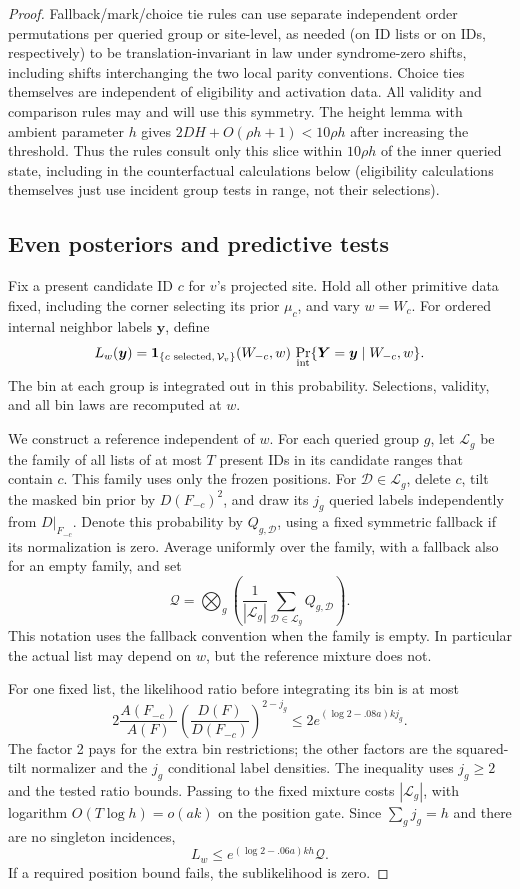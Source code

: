 \begin{proof}
Fallback/mark/choice tie rules can use separate independent order permutations per queried group or site-level, as needed (on ID lists or on IDs, respectively) to be translation-invariant in law under syndrome-zero shifts, including shifts interchanging the two local parity conventions. Choice ties themselves are independent of eligibility and activation data. All validity and comparison rules may and will use this symmetry. The height lemma with ambient parameter \(h\) gives \(2DH+O(\rho h+1)<10\rho h\) after increasing the threshold. Thus the rules consult only this slice within \(10\rho h\) of the inner queried state, including in the counterfactual calculations below (eligibility calculations themselves just use incident group tests in range, not their selections).

\subsection{Even posteriors and predictive tests}
\label{sec:internal-even-posteriors}

Fix a present candidate ID \(c\) for \(v\)'s projected site. Hold all other primitive data fixed, including the corner selecting its prior \(\mu_c\), and vary \(w=W_c\). For ordered internal neighbor labels \(\boldsymbol y\), define
\[
 L_w(\boldsymbol y)=
 \mathbf1_{\{c\text{ selected},\,\mathcal V_v\}}(W_{-c},w)\,
 \Pr_{\rm int}\{\boldsymbol Y=\boldsymbol y\mid W_{-c},w\}.
\]
The bin at each group is integrated out in this probability. Selections, validity, and all bin laws are recomputed at \(w\).

We construct a reference independent of \(w\). For each queried group \(g\), let \(\mathcal L_g\) be the family of all lists of at most \(T\) present IDs in its candidate ranges that contain \(c\). This family uses only the frozen positions. For \(\mathcal D\in\mathcal L_g\), delete \(c\), tilt the masked bin prior by \(D(F_{-c})^2\), and draw its \(j_g\) queried labels independently from \(D|_{F_{-c}}\). Denote this probability by \(Q_{g,\mathcal D}\), using a fixed symmetric fallback if its normalization is zero. Average uniformly over the family, with a fallback also for an empty family, and set
\[
 \mathcal Q=\bigotimes_g
  \left(\frac1{|\mathcal L_g|}\sum_{\mathcal D\in\mathcal L_g}Q_{g,\mathcal D}\right).
\]
This notation uses the fallback convention when the family is empty. In particular the actual list may depend on \(w\), but the reference mixture does not.

For one fixed list, the likelihood ratio before integrating its bin is at most
\[
 2\frac{A(F_{-c})}{A(F)}
       \left(\frac{D(F)}{D(F_{-c})}\right)^{2-j_g}
 \le2e^{(\log2-.08a)kj_g}.
\]
The factor 2 pays for the extra bin restrictions; the other factors are the squared-tilt normalizer and the \(j_g\) conditional label densities. The inequality uses \(j_g\ge2\) and the tested ratio bounds. Passing to the fixed mixture costs \(|\mathcal L_g|\), with logarithm \(O(T\log h)=o(ak)\) on the position gate. Since \(\sum_g j_g=h\) and there are no singleton incidences,
\[
 L_w\le e^{(\log2-.06a)kh}\mathcal Q.
\]
If a required position bound fails, the sublikelihood is zero.


\end{proof}
